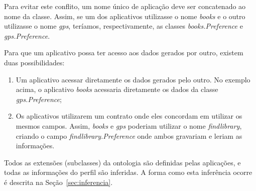 Para evitar este conflito, um nome único de aplicação deve ser concatenado ao nome da classe. Assim, se um dos aplicativos utilizasse o nome {\em books} e o outro utilizasse o nome {\em gps}, teríamos, respectivamente, as classes {\em books.Preference} e {\em gps.Preference}.

Para que um aplicativo possa ter acesso aos dados gerados por outro, existem duas possibilidades:

\begin{enumerate}

  \item Um aplicativo acessar diretamente os dados gerados pelo outro. No exemplo acima, o aplicativo {\em books} acessaria diretamente os dados da classe {\em gps.Preference};

  \item Os aplicativos utilizarem um contrato onde eles concordam em utilizar os mesmos campos. Assim, {\em books} e {\em gps} poderiam utilizar o nome {\em findlibrary}, criando o campo {\em findlibrary.Preference} onde ambos gravariam e leriam as informações.

\end{enumerate}

Todos as extensões (subclasses) da ontologia são definidas pelas aplicações, e todas as informações do perfil são inferidas. A forma como esta inferência ocorre é descrita na Seção~\ref{sec:inferencia}.
